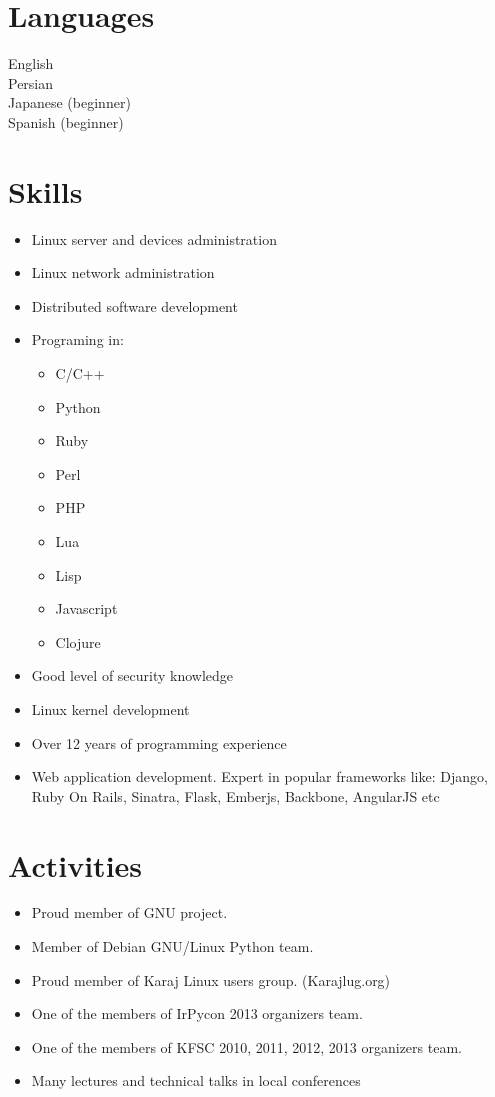 \documentclass[a4paper,11pt]{article}
\begin{document}
\section*{Languages}
English\\
Persian\\
Japanese (beginner)\\
Spanish (beginner)\\


\section*{Skills}
\begin{itemize}
\item Linux server and devices administration
\item Linux network administration
\item Distributed software development
\item Programing in:
  \begin{itemize}
  \item C/C++
  \item Python
  \item Ruby
  \item Perl
  \item PHP
  \item Lua
  \item Lisp
  \item Javascript
  \item Clojure
  \end{itemize}

\item Good level of security knowledge
\item Linux kernel development
\item Over 12 years of programming experience
\item Web application development. Expert in popular frameworks like: Django, Ruby On Rails, Sinatra, Flask, Emberjs, Backbone, AngularJS etc
\end{itemize}


\section*{Activities}
\begin{itemize}
\item Proud member of GNU project.
\item Member of Debian GNU/Linux Python team.
\item Proud member of Karaj Linux users group. (Karajlug.org)
\item One of the members of IrPycon 2013 organizers team.
\item One of the members of KFSC 2010, 2011, 2012, 2013 organizers team.
\item Many lectures and technical talks in local conferences
\end{itemize}
\end{document}
